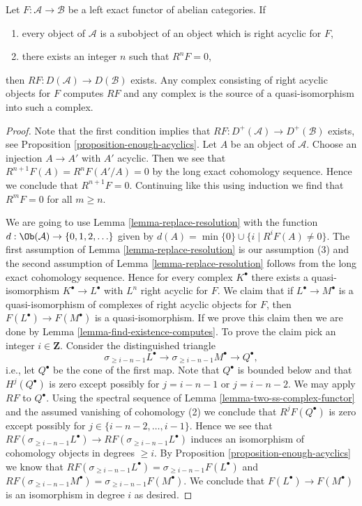 \begin{lemma}
\label{lemma-unbounded-right-derived}
Let $F : \mathcal{A} \to \mathcal{B}$ be a left exact functor of
abelian categories. If
\begin{enumerate}
\item every object of $\mathcal{A}$ is a subobject of an object
which is right acyclic for $F$,
\item there exists an integer $n$ such that $R^nF = 0$,
\end{enumerate}
then $RF : D(\mathcal{A}) \to D(\mathcal{B})$ exists. Any
complex consisting of right acyclic objects for $F$ computes
$RF$ and any complex is the source of a quasi-isomorphism
into such a complex.
\end{lemma}

\begin{proof}
Note that the first condition implies that
$RF : D^+(\mathcal{A}) \to D^+(\mathcal{B})$ exists, see
Proposition \ref{proposition-enough-acyclics}.
Let $A$ be an object of $\mathcal{A}$. Choose an injection $A \to A'$
with $A'$ acyclic. Then we see that $R^{n + 1}F(A) = R^nF(A'/A) = 0$ by
the long exact cohomology sequence. Hence we conclude that $R^{n + 1}F = 0$.
Continuing like this using induction we find that $R^mF = 0$ for all
$m \geq n$.

\medskip\noindent
We are going to use Lemma \ref{lemma-replace-resolution} with the function
$d : \Ob(\mathcal{A}) \to \{0, 1, 2, \ldots \}$ given by
$d(A) = \min \{0\} \cup \{i \mid R^iF(A) \not = 0\}$.
The first assumption of Lemma \ref{lemma-replace-resolution}
is our assumption (3) and the second assumption of
Lemma \ref{lemma-replace-resolution} follows from the long exact
cohomology sequence. Hence for every complex $K^\bullet$ there exists a
quasi-isomorphism $K^\bullet \to L^\bullet$ with $L^n$ right acyclic for $F$.
We claim that if $L^\bullet \to M^\bullet$ is a quasi-isomorphism of
complexes of right acyclic objects for $F$, then
$F(L^\bullet) \to F(M^\bullet)$
is a quasi-isomorphism. If we prove this claim then we are done by
Lemma \ref{lemma-find-existence-computes}.
To prove the claim pick an integer $i \in \mathbf{Z}$.
Consider the distinguished triangle
$$
\sigma_{\geq i - n - 1}L^\bullet \to
\sigma_{\geq i - n - 1}M^\bullet \to Q^\bullet,
$$
i.e., let $Q^\bullet$ be the cone of the first map.
Note that $Q^\bullet$ is bounded below and that
$H^j(Q^\bullet)$ is zero except possibly for $j = i - n - 1$
or $j = i - n - 2$. We may apply $RF$ to $Q^\bullet$.
Using the spectral sequence of Lemma \ref{lemma-two-ss-complex-functor}
and the assumed vanishing of cohomology (2) we conclude
that $R^jF(Q^\bullet)$ is zero except possibly for
$j \in \{i - n - 2, \ldots, i - 1\}$. Hence we see that
$RF(\sigma_{\geq i - n - 1}L^\bullet) \to RF(\sigma_{\geq i - n - 1}L^\bullet)$
induces an isomorphism of cohomology objects in degrees $\geq i$.
By Proposition \ref{proposition-enough-acyclics} we know that
$RF(\sigma_{\geq i - n - 1}L^\bullet) = \sigma_{\geq i - n - 1}F(L^\bullet)$
and
$RF(\sigma_{\geq i - n - 1}M^\bullet) = \sigma_{\geq i - n - 1}F(M^\bullet)$.
We conclude that $F(L^\bullet) \to F(M^\bullet)$
is an isomorphism in degree $i$ as desired.
\end{proof}


